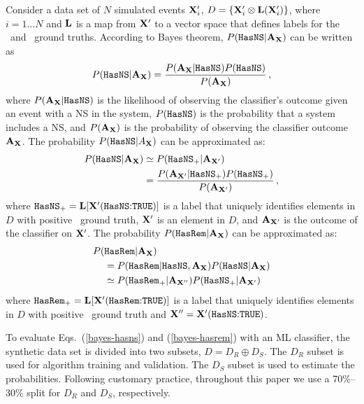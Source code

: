 Consider a data set of $N$ simulated events ${\bf X}'_i$, $D=\{{\bf X}'_i\otimes{\bf L}({\bf X}'_i)\}$, where $i=1\dots N$ and ${\bf L}$ is a map from ${\bf X}'$ to a vector space
that defines labels for the \hasns\ and \hasrem\ ground truths. According to Bayes theorem, $P({{\tt HasNS}}|{\bf A}_{\bf X})$  can be written as 
%
\begin{equation}
P({{\tt HasNS}}|{\bf A}_{\bf X})=\frac{P({\bf A}_{\bf X}|{{\tt HasNS}})P({{\tt HasNS}})}{P({\bf A}_{\bf X})}\,,
\label{bayes}
\end{equation}
%
where $P({\bf A}_{\bf X}|{{\tt HasNS}})$ is the likelihood of observing the classifier's outcome given an event with a \ac{NS} in the system, $P({{\tt HasNS}})$ is the probability that a system includes a \ac{NS}, and $P({\bf A}_{\bf X})$ is the probability of observing the classifier outcome ${\bf A}_{\bf X}$. The probability $P({{\tt HasNS}}|A_{\bf X})$ can be approximated as:  
%
\begin{align}
P({{\tt HasNS}}|{\bf A}_{\bf X})&\simeq P({{\tt HasNS}}_+|{\bf A}_{{\bf X}'})\nonumber\\
&=\frac{P({\bf A}_{{\bf X}'}|{{\tt HasNS}}_+)P({{\tt HasNS}}_+)}{P({\bf A}_{{\bf X}'})}\,,
\label{bayes-hasns}
\end{align}
%
where ${{\tt HasNS}}_+={\bf L}[{\bf X}'(\hbox{{{\tt HasNS}}:{{\tt TRUE}}})]$ is a label that uniquely identifies elements in $D$ with positive \hasns\ ground truth, ${\bf X}'$ is an element in $D$, and ${\bf A}_{{\bf X}'}$ is the outcome of the classifier on ${\bf X}'$. The probability $P({{\tt HasRem}}|{\bf A}_{\bf X})$ can be approximated as:
%
\begin{align}
P(&{{\tt HasRem}}|{\bf A}_{\bf X})\nonumber\\
&=P({{\tt HasRem}}|{{\tt HasNS}}, {\bf A}_{\bf X})P({{\tt HasNS}}|{\bf A}_{\bf X})\nonumber\\
&\simeq P({{\tt HasRem}}_+|{\bf A}_{{\bf X}''})P({{\tt HasNS}}_+|{\bf A}_{{\bf X}'})
\label{bayes-hasrem}
\end{align}
%
where ${{\tt HasRem}}_+={\bf L}[{\bf X}'(\hbox{{{\tt HasRem}}:{{\tt TRUE}}})]$ is a label that uniquely identifies elements in $D$ with positive \hasrem\ ground truth and ${\bf X}''= {\bf X}'(\hbox{{{\tt HasNS}}:{{\tt TRUE}}})$.

To evaluate Eqs.~(\ref{bayes-hasns}) and (\ref{bayes-hasrem}) with an \ac{ML} classifier, the synthetic data set is divided into two subsets, $D=D_R\oplus D_S$. The $D_R$ subset is used for
algorithm training and validation. The $D_S$ subset is used to estimate the probabilities. Following customary practice, throughout this paper we use a 70\%--30\% split for $D_R$ and $D_S$,
respectively.

